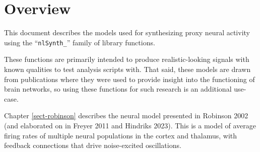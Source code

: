
\chapter{Overview}
\label{sect-over}

This document describes the models used for synthesizing proxy neural
activity using the ``\texttt{nlSynth\_}'' family of library functions.

These functions are primarily intended to produce realistic-looking signals
with known qualities to test analysis scripts with. That said, these models
are drawn from publications where they were used to provide insight into
the functioning of brain networks, so using these functions for such
research is an additional use-case.

Chapter \ref{sect-robinson} describes the neural model presented in
Robinson 2002 (and elaborated on in Freyer 2011 and Hindriks 2023). This
is a model of average firing rates of multiple neural populations in the
cortex and thalamus, with feedback connections that drive noise-excited
oscillations.


%
